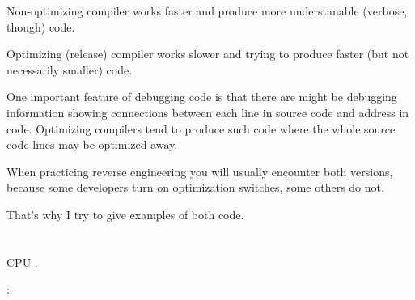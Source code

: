 Non-optimizing compiler works faster and produce more understanable (verbose, though) code.

Optimizing (release) compiler works slower and trying to produce faster (but not necessarily smaller) code.

One important feature of debugging code is that there are might be debugging information showing connections
between each line in source code and address in code.
Optimizing compilers tend to produce such code where the whole source code lines may be optimized away.

When practicing reverse engineering you will usually encounter both versions, because some developers turn on optimization
switches, some others do not.

That's why I try to give examples of both code.

\fi

\chapter{}

 \ac{CPU} .

:

